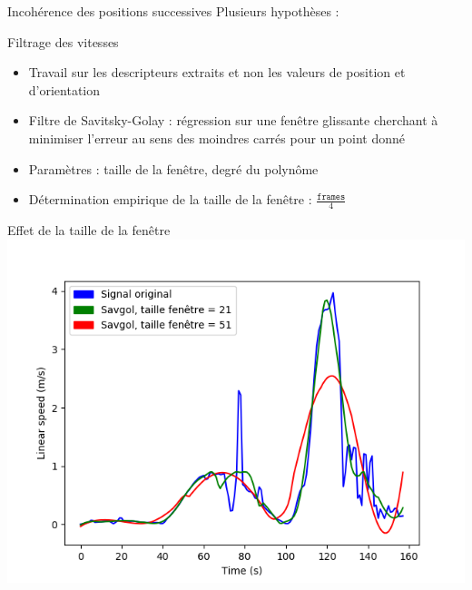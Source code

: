 \documentclass[svgnames]{beamer}
\begin{document}
	\begin{frame}{Incohérence des positions successives}
	Plusieurs hypothèses :
		\begin{center}
				\begin{table}[h!]
				\end{table}
		\end{center}
	\end{frame}
	
	\begin{frame}{Filtrage des vitesses}
		\begin{itemize}[label=$\bullet$]
			\item Travail sur les descripteurs extraits et non les valeurs de position et d'orientation
			\item Filtre de Savitsky-Golay : régression sur une fenêtre glissante cherchant à minimiser l'erreur au sens des moindres carrés pour un point donné 
			\item Paramètres : taille de la fenêtre, degré du polynôme	
			\item Détermination empirique de la taille de la fenêtre : $\frac{\texttt{frames}}{4}$ 	
		\end{itemize}
	\end{frame}
	
	\begin{frame}{Effet de la taille de la fenêtre}
	\centering
		\includegraphics[scale=0.6]{img/savgol_comparison_all_3_at_once.png}
	
	\end{frame}
	
\end{document}

